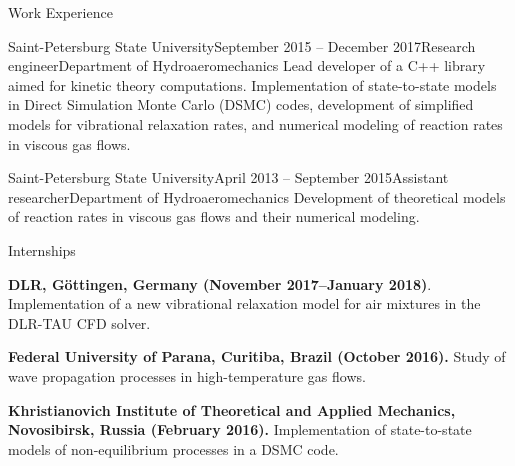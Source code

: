 \documentclass{resume} %
\begin{document}
\begin{rSection}{Work Experience}

\begin{rSubsection}{Saint-Petersburg State University}{September 2015 -- December 2017}{Research engineer}{Department of Hydroaeromechanics}
Lead developer of a C++ library aimed for kinetic theory computations. Implementation of state-to-state models in Direct Simulation Monte Carlo (DSMC) codes, development of simplified models for vibrational relaxation rates, and numerical modeling of reaction rates in viscous gas flows.
\end{rSubsection}

\begin{rSubsection}{Saint-Petersburg State University}{April 2013 -- September 2015}{Assistant researcher}{Department of Hydroaeromechanics}
Development of theoretical models of reaction rates in viscous gas flows and their numerical modeling.
\end{rSubsection}



\begin{rSubsection}{Internships}{}{}{}
\item \textbf{DLR, G\"{o}ttingen, Germany (November 2017--January 2018)}.
Implementation of a new  vibrational relaxation model for air mixtures in the DLR-TAU CFD solver.

\item \textbf{Federal University of Parana, Curitiba, Brazil (October 2016).}
Study of wave propagation processes in high-temperature gas flows.

\item \textbf{Khristianovich Institute of Theoretical and Applied Mechanics, Novosibirsk, Russia (February 2016).}
Implementation of state-to-state models of non-equilibrium processes in a DSMC code.
\end{rSubsection}
\end{rSection}
\end{document}
